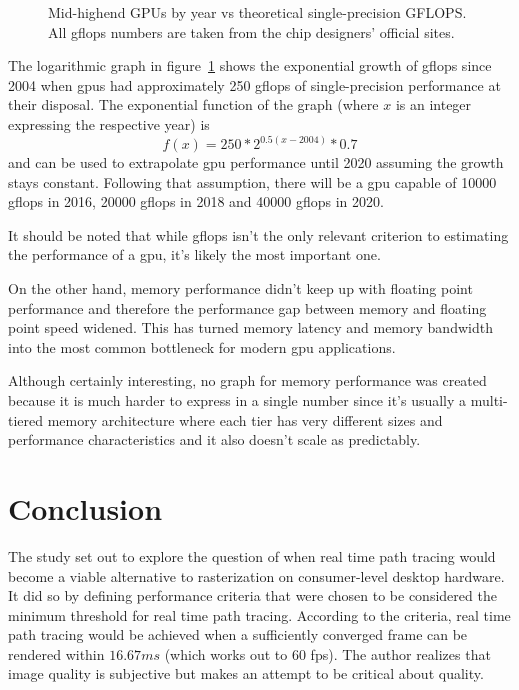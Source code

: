 \documentclass[
  twoside,
  11pt, a4paper,
  footinclude=true,
  headinclude=true,
  cleardoublepage=empty
]{scrreprt}
\begin{document}
\begin{figure}[H]
    \centering
    \caption{Mid-highend GPUs by year vs theoretical single-precision GFLOPS.
    All \ac{gflops} numbers are taken from the chip designers' official sites.}
    \label{fig:gpus-by-year}
\end{figure}

The logarithmic graph in figure~\ref{fig:gpus-by-year} shows the exponential growth of \ac{gflops} since 2004
when \acp{gpu} had approximately 250 \ac{gflops} of single-precision performance at their disposal.
The exponential function of the graph
(where \(x\) is an integer expressing the respective year) is
\[ f(x) = 250 * 2 ^ {0.5 (x-2004)} * 0.7 \]
and can be used to extrapolate \ac{gpu} performance until 2020 assuming the growth stays constant.
Following that assumption, there will be a \ac{gpu} capable of 10000 \ac{gflops} in 2016, 20000
\ac{gflops} in 2018 and 40000 \ac{gflops} in 2020.

It should be noted that while \ac{gflops} isn't the only relevant criterion to estimating the
performance of a \ac{gpu}, it's likely the most important one.

On the other hand, memory performance didn't keep up with floating point performance and therefore
the performance gap between memory and floating point speed widened. This has turned memory latency
and memory bandwidth into the most common bottleneck for modern \ac{gpu} applications.

Although certainly interesting, no graph for memory performance was created because
it is much harder to express in a single number since it's usually
a multi-tiered memory architecture where each tier has very different sizes
and performance characteristics and it also doesn't scale as predictably.

\chapter{Conclusion}
The study set out to explore the question of when real time path tracing would become
a viable alternative to rasterization on consumer-level desktop hardware. It did so by defining
performance criteria that were chosen to be considered the minimum threshold for real time path tracing.
According to the criteria, real time path tracing would be achieved when a sufficiently converged
frame can be rendered within \(16.67ms\) (which works out to 60 \ac{fps}). The author realizes that
image quality is subjective but makes an attempt to be critical about quality.
\end{document}
